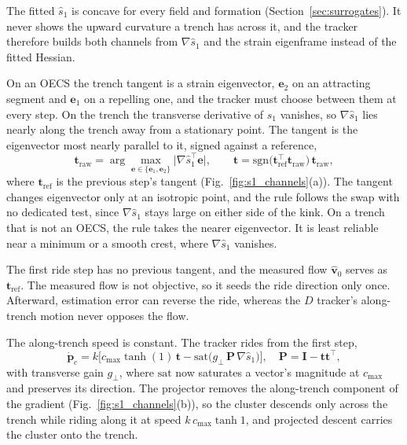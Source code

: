 \documentclass[lettersize,journal]{IEEEtran}
\begin{document}
The fitted $\hat{s}_1$ is concave for every field and formation
(Section~\ref{sec:surrogates}). It never shows the upward curvature a
trench has across it, and the tracker therefore builds both channels from
$\nabla\hat{s}_1$ and the strain eigenframe instead of the fitted Hessian.

On an OECS the trench tangent is a strain eigenvector, $\mathbf{e}_2$ on
an attracting segment and $\mathbf{e}_1$ on a repelling one, and the
tracker must choose between them at every step. On the trench the
transverse derivative of $s_1$ vanishes, so $\nabla\hat{s}_1$ lies nearly
along the trench away from a stationary point. The tangent is the
eigenvector most nearly parallel to it, signed against a reference,
\begin{equation}
    \mathbf{t}_{\mathrm{raw}} =
    \arg\max_{\mathbf{e} \in \{\mathbf{e}_1, \mathbf{e}_2\}}
    \bigl\lvert \nabla\hat{s}_1^\top \mathbf{e} \bigr\rvert,
    \qquad
    \mathbf{t} = \mathrm{sgn}\bigl(\mathbf{t}_{\mathrm{ref}}^\top
    \mathbf{t}_{\mathrm{raw}}\bigr)\,\mathbf{t}_{\mathrm{raw}},
    \label{eq:tangent_select}
\end{equation}
where $\mathbf{t}_{\mathrm{ref}}$ is the previous step's tangent
(Fig.~\ref{fig:s1_channels}(a)). The tangent changes eigenvector only at
an isotropic point, and the rule follows the swap with no dedicated test,
since $\nabla\hat{s}_1$ stays large on either side of the kink. On a
trench that is not an OECS, the rule takes the nearer eigenvector. It is
least reliable near a minimum or a smooth crest, where $\nabla\hat{s}_1$
vanishes.

The first ride step has no previous tangent, and the measured flow
$\hat{\mathbf{v}}_0$ serves as $\mathbf{t}_{\mathrm{ref}}$. The measured
flow is not objective, so it seeds the ride direction only once. Afterward, estimation error can reverse the
ride, whereas the $D$ tracker's along-trench motion never opposes the
flow.

The along-trench speed is constant. The tracker rides from the first step,
\begin{equation}
    \dot{\mathbf{p}}_c = k\bigl[
    c_{\max}\tanh(1)\,\mathbf{t}
    - \mathrm{sat}\!\bigl(g_\perp\,\mathbf{P}\,\nabla\hat{s}_1\bigr)\bigr],
    \quad
    \mathbf{P} = \mathbf{I} - \mathbf{t}\mathbf{t}^\top,
    \label{eq:s1_law}
\end{equation}
with transverse gain $g_\perp$, where $\mathrm{sat}$ now saturates a
vector's magnitude at $c_{\max}$ and preserves its direction. The projector
removes the along-trench component of the gradient
(Fig.~\ref{fig:s1_channels}(b)), so the cluster descends only across the
trench while riding along it at speed $k\,c_{\max}\tanh 1$, and projected
descent carries the cluster onto the trench.
\end{document}
